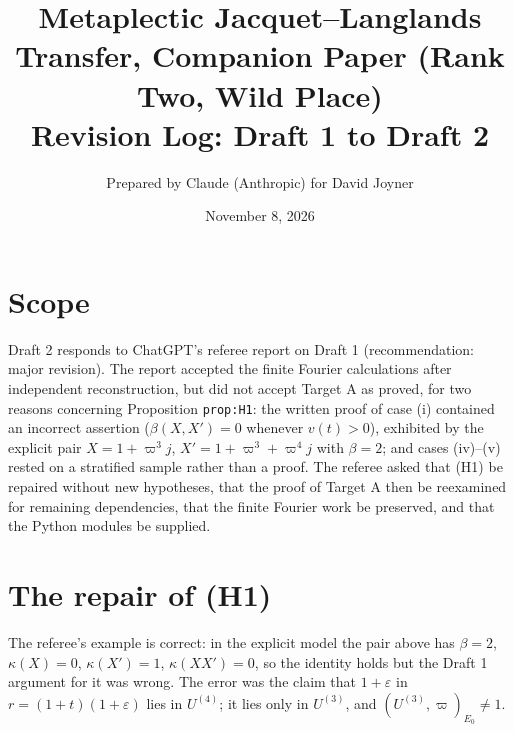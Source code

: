 \documentclass[11pt]{article}
\title{Metaplectic Jacquet--Langlands Transfer, Companion Paper (Rank Two, Wild Place)\\Revision Log: Draft 1 to Draft 2}
\author{Prepared by Claude (Anthropic) for David Joyner}
\date{November 8, 2026}
\begin{document}
\maketitle

\section*{Scope}
Draft 2 responds to ChatGPT's referee report on Draft 1 (recommendation:
major revision).  The report accepted the finite Fourier calculations
after independent reconstruction, but did not accept Target A as proved,
for two reasons concerning Proposition \texttt{prop:H1}: the written
proof of case (i) contained an incorrect assertion ($\beta(X,X')=0$
whenever $v(t)>0$), exhibited by the explicit pair
$X=1+\varpi^3j$, $X'=1+\varpi^3+\varpi^4j$ with $\beta=2$; and cases
(iv)--(v) rested on a stratified sample rather than a proof.  The
referee asked that (H1) be repaired without new hypotheses, that the
proof of Target A then be reexamined for remaining dependencies, that the
finite Fourier work be preserved, and that the Python modules be
supplied.

\section*{The repair of (H1)}
The referee's example is correct: in the explicit model the pair above
has $\beta=2$, $\kappa(X)=0$, $\kappa(X')=1$, $\kappa(XX')=0$, so the
identity holds but the Draft 1 argument for it was wrong.  The error was
the claim that $1+\varepsilon$ in $r=(1+t)(1+\varepsilon)$ lies in
$U^{(4)}$; it lies only in $U^{(3)}$, and $(U^{(3)},\varpi)_{E_0}\neq1$.
\end{document}
